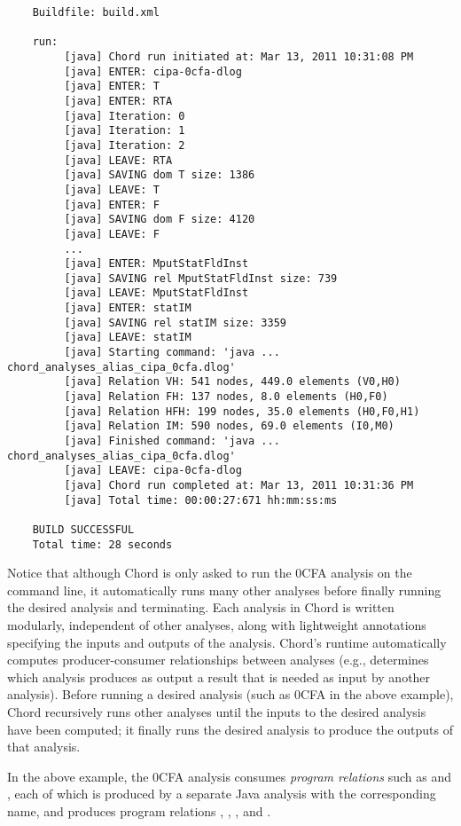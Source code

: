 \begin{verbatim}
    Buildfile: build.xml

    run:
         [java] Chord run initiated at: Mar 13, 2011 10:31:08 PM
         [java] ENTER: cipa-0cfa-dlog
         [java] ENTER: T
         [java] ENTER: RTA
         [java] Iteration: 0
         [java] Iteration: 1
         [java] Iteration: 2
         [java] LEAVE: RTA
         [java] SAVING dom T size: 1386
         [java] LEAVE: T
         [java] ENTER: F
         [java] SAVING dom F size: 4120
         [java] LEAVE: F
         ...
         [java] ENTER: MputStatFldInst
         [java] SAVING rel MputStatFldInst size: 739
         [java] LEAVE: MputStatFldInst
         [java] ENTER: statIM
         [java] SAVING rel statIM size: 3359
         [java] LEAVE: statIM
         [java] Starting command: 'java ... chord_analyses_alias_cipa_0cfa.dlog'
         [java] Relation VH: 541 nodes, 449.0 elements (V0,H0)
         [java] Relation FH: 137 nodes, 8.0 elements (H0,F0)
         [java] Relation HFH: 199 nodes, 35.0 elements (H0,F0,H1)
         [java] Relation IM: 590 nodes, 69.0 elements (I0,M0)
         [java] Finished command: 'java ... chord_analyses_alias_cipa_0cfa.dlog'
         [java] LEAVE: cipa-0cfa-dlog
         [java] Chord run completed at: Mar 13, 2011 10:31:36 PM
         [java] Total time: 00:00:27:671 hh:mm:ss:ms

    BUILD SUCCESSFUL
    Total time: 28 seconds
\end{verbatim}

Notice that although Chord is only asked to run the 0CFA analysis on the command line, it automatically
runs many other analyses before finally running the desired analysis and terminating.
Each analysis in Chord is written modularly, independent of other analyses, along with lightweight
annotations specifying the inputs and outputs of the analysis.  Chord's runtime automatically computes
producer-consumer relationships between analyses (e.g., determines which analysis produces as output a
result that is needed as input by another analysis).  Before running a desired analysis
(such as 0CFA in the above example), Chord recursively runs other analyses until the
inputs to the desired analysis have been computed; it finally runs the desired analysis to produce
the outputs of that analysis.

In the above example, the 0CFA analysis consumes {\it program relations} 
such as  and , each of which is produced by a separate Java analysis with the
corresponding name, and produces program relations , , , and .

